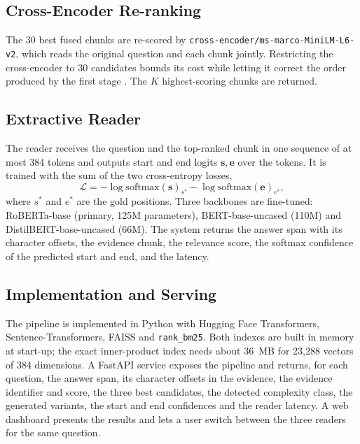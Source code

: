\documentclass[conference]{IEEEtran}
\begin{document}
\subsection{Cross-Encoder Re-ranking}
The 30 best fused chunks are re-scored by \texttt{cross-encoder/ms-marco-MiniLM-L6-v2}, which
reads the original question and each chunk jointly. Restricting the cross-encoder to 30
candidates bounds its cost while letting it correct the order produced by the first stage
\cite{hambarde2023}. The $K$ highest-scoring chunks are returned.

\subsection{Extractive Reader}
The reader receives the question and the top-ranked chunk in one sequence of at most 384 tokens
and outputs start and end logits $\mathbf{s},\mathbf{e}$ over the tokens. It is trained with the
sum of the two cross-entropy losses,
\begin{equation}
\mathcal{L}=-\log\mathrm{softmax}(\mathbf{s})_{s^\ast}-\log\mathrm{softmax}(\mathbf{e})_{e^\ast},
\end{equation}
where $s^\ast$ and $e^\ast$ are the gold positions. Three backbones are fine-tuned: RoBERTa-base
\cite{liu2019} (primary, 125M parameters), BERT-base-uncased \cite{devlin2019} (110M) and
DistilBERT-base-uncased \cite{sanh2019} (66M). The system returns the answer span with its
character offsets, the evidence chunk, the relevance score, the softmax confidence of the
predicted start and end, and the latency.

\subsection{Implementation and Serving}
The pipeline is implemented in Python with Hugging Face Transformers, Sentence-Transformers,
FAISS and \texttt{rank\_bm25}. Both indexes are built in memory at start-up; the exact
inner-product index needs about 36~MB for 23,288 vectors of 384 dimensions. A FastAPI service
exposes the pipeline and returns, for each question, the answer span, its character offsets in
the evidence, the evidence identifier and score, the three best candidates, the detected
complexity class, the generated variants, the start and end confidences and the reader latency.
A web dashboard presents the results and lets a user switch between the three readers for the
same question.

\end{document}
